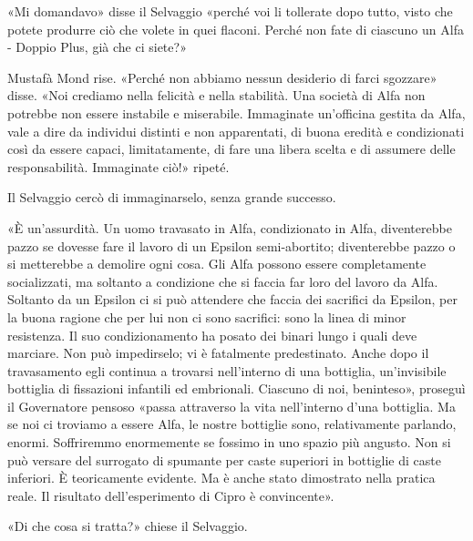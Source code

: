 \documentclass[
a5paper, %
10pt, %
twoside, 
onecolumn, %
openany, %
]{memoir}
\begin{document}
«Mi domandavo» disse il Selvaggio «perché voi li tollerate dopo tutto, visto che potete produrre ciò che volete in quei flaconi. Perché non fate di ciascuno un Alfa - Doppio Plus, già che ci siete?»

Mustafà Mond rise. «Perché non abbiamo nessun desiderio di farci sgozzare» disse. «Noi crediamo nella felicità e nella stabilità. Una società di Alfa non potrebbe non essere instabile e miserabile. Immaginate un’officina gestita da Alfa, vale a dire da individui distinti e non apparentati, di buona eredità e condizionati così da essere capaci, limitatamente, di fare una libera scelta e di assumere delle responsabilità. Immaginate ciò!» ripeté.

Il Selvaggio cercò di immaginarselo, senza grande successo.

«È un’assurdità. Un uomo travasato in Alfa, condizionato in Alfa, diventerebbe pazzo se dovesse fare il lavoro di un Epsilon semi-abortito; diventerebbe pazzo o si metterebbe a demolire ogni cosa. Gli Alfa possono essere completamente socializzati, ma soltanto a condizione che si faccia far loro del lavoro da Alfa. Soltanto da un Epsilon ci si può attendere che faccia dei sacrifici da Epsilon, per la buona ragione che per lui non ci sono sacrifici: sono la linea di minor resistenza. Il suo condizionamento ha posato dei binari lungo i quali deve marciare. Non può impedirselo; vi è fatalmente predestinato. Anche dopo il travasamento egli continua a trovarsi nell’interno di una bottiglia, un’invisibile bottiglia di fissazioni infantili ed embrionali. Ciascuno di noi, beninteso», proseguì il Governatore pensoso «passa attraverso la vita nell’interno d’una bottiglia. Ma se noi ci troviamo a essere Alfa, le nostre bottiglie sono, relativamente parlando, enormi. Soffriremmo enormemente se fossimo in uno spazio più angusto. Non si può versare del surrogato di spumante per caste superiori in bottiglie di caste inferiori. È teoricamente evidente. Ma è anche stato dimostrato nella pratica reale. Il risultato dell’esperimento di Cipro è convincente».

«Di che cosa si tratta?» chiese il Selvaggio.
\end{document}
